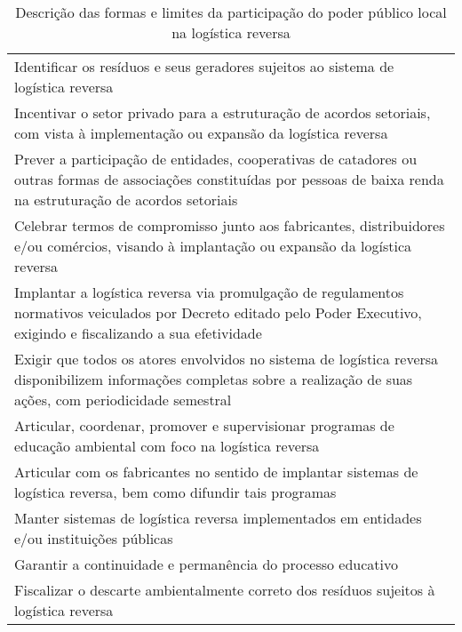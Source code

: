 \begin{table}[htbp]
	\centering
	\caption{Descrição das formas e limites da participação do poder público local na logística reversa}
	\begin{tabular}{P{40.855em}}
		 Identificar os resíduos e seus geradores sujeitos ao sistema de logística reversa \\
		 Incentivar o setor privado para a estruturação de acordos setoriais, com vista à implementação ou expansão da logística reversa \\
		 Prever a participação de entidades, cooperativas de catadores ou outras formas de associações constituídas por pessoas de baixa renda na estruturação de acordos setoriais \\
		 Celebrar termos de compromisso junto aos fabricantes, distribuidores e/ou comércios, visando à implantação ou expansão da logística reversa \\
		 Implantar a logística reversa via promulgação de regulamentos normativos veiculados por Decreto editado pelo Poder Executivo, exigindo e fiscalizando a sua efetividade \\
		 Exigir que todos os atores envolvidos no sistema de logística reversa disponibilizem informações completas sobre a realização de suas ações, com periodicidade semestral  \\
		 Articular, coordenar, promover e supervisionar programas de educação ambiental com foco na logística reversa \\
		 Articular com os fabricantes no sentido de implantar sistemas de logística reversa, bem como difundir tais programas \\
		 Manter sistemas de logística reversa implementados em entidades e/ou instituições públicas \\
		 Garantir a continuidade e permanência do processo educativo \\
		 Fiscalizar o descarte ambientalmente correto dos resíduos sujeitos à logística reversa \\
	\end{tabular}%
	\label{tab:limites_log_reversa}%
\end{table}%
